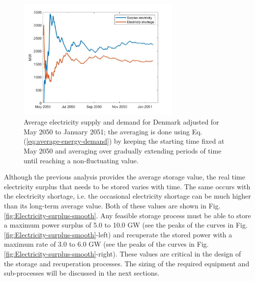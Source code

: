\documentclass{ECOS_2021}
\begin{document}
\begin{figure}[H]
\centering
\includegraphics[width=8cm]{supply_demand_six_month_dk}

\caption{\label{fig:Average-electricity-supply}Average electricity supply
and demand for Denmark adjusted for May 2050 to January 2051; the averaging is done using 
Eq. (\ref{eq:average-energy-demand}) by keeping the starting time fixed at May 2050 and averaging over 
gradually extending periods of time until reaching a non-fluctuating value.}
\end{figure}

Although the previous analysis provides the average storage value,
the real time electricity surplus that needs to be stored varies with
time. The same occurs with the electricity shortage, i.e. the occasional
electricity shortage can be much higher than its long-term average
value. Both of these values are shown in Fig. \ref{fig:Electricity-surplus-smooth}.
Any feasible storage process must be able to store a maximum power
surplus of 5.0 to 10.0 GW (see the peaks of the curves in Fig. \ref{fig:Electricity-surplus-smooth}-left)
and recuperate the stored power with a maximum rate of 3.0 to 6.0
GW (see the peaks of the curves in Fig. \ref{fig:Electricity-surplus-smooth}-right).
These values are critical in the design of the storage and recuperation
processes. The sizing of the required equipment and sub-processes
will be discussed in the next sections. 
\end{document}
